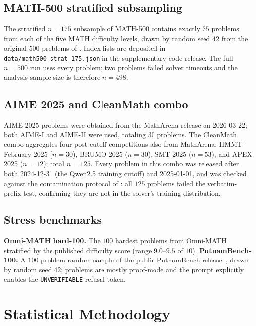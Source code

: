 \documentclass{article}
\begin{document}
\subsection{MATH-500 stratified subsampling}

The stratified $n{=}175$ subsample of MATH-500 contains exactly $35$
problems from each of the five MATH difficulty levels, drawn by random
seed $42$ from the original $500$ problems of \citet{lightman2024prm}.
Index lists are deposited in \texttt{data/math500\_strat\_175.json} in
the supplementary code release. The full $n{=}500$ run uses every
problem; two problems failed solver timeouts and the analysis sample
size is therefore $n{=}498$.

\subsection{AIME 2025 and CleanMath combo}

AIME 2025 problems were obtained from the MathArena\citep{matharena2025}
release on 2026-03-22; both AIME-I and AIME-II were used, totaling $30$
problems. The CleanMath combo aggregates four post-cutoff competitions
also from MathArena: HMMT-February 2025 ($n{=}30$), BRUMO 2025
($n{=}30$), SMT 2025 ($n{=}53$), and APEX 2025 ($n{=}12$); total
$n{=}125$. Every problem in this combo was released after both
2024-12-31 (the Qwen2.5 training cutoff) and 2025-01-01, and was checked
against the contamination protocol of \citet{wu2025contam}: all $125$
problems failed the verbatim-prefix test, confirming they are not in
the solver's training distribution.

\subsection{Stress benchmarks}

\textbf{Omni-MATH hard-100.} The $100$ hardest problems from
Omni-MATH~\citep{omnimath2024} stratified by the published difficulty
score (range $9.0$--$9.5$ of $10$). \textbf{PutnamBench-100.} A
$100$-problem random sample of the public PutnamBench
release~\citep{amitayusht2024putnambench}, drawn by random seed $42$;
problems are mostly proof-mode and the prompt explicitly enables the
\texttt{UNVERIFIABLE} refusal token.

\section{Statistical Methodology}
\label{app:stats}
\end{document}
